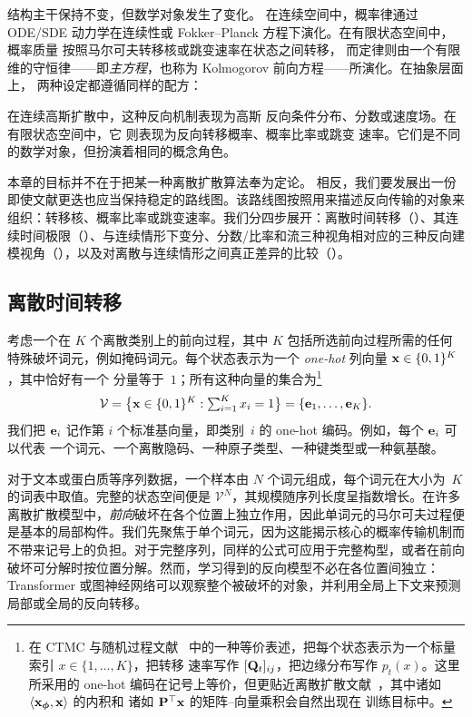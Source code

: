 结构主干保持不变，但数学对象发生了变化。
在连续空间中，概率律通过 ODE/SDE 动力学在连续性或
Fokker--Planck 方程下演化。在有限状态空间中，概率质量
按照马尔可夫转移核或跳变速率在状态之间转移，
而定律则由一个有限维的守恒律——即\emph{主方程}，也称为 Kolmogorov 前向方程——所演化。在抽象层面上，
两种设定都遵循同样的配方：


在连续高斯扩散中，这种反向机制表现为高斯
反向条件分布、分数或速度场。在有限状态空间中，它
则表现为反向转移概率、概率比率或跳变
速率。它们是不同的数学对象，但扮演着相同的概念角色。

本章的目标并不在于把某一种离散扩散算法奉为定论。
相反，我们要发展出一份即使文献更迭也应当保持稳定的路线图。该路线图按照用来描述反向传输的对象来组织：转移核、概率比率或跳变速率。我们分四步展开：离散时间转移（）、其连续时间极限（）、与连续情形下变分、分数/比率和流三种视角相对应的三种反向建模视角（），以及对离散与连续情形之间真正差异的比较（）。

\subsection{离散时间转移}
\label{subsec:epilogue-dtmc}

考虑一个在 $K$ 个离散类别上的前向过程，其中 $K$
包括所选前向过程所需的任何特殊破坏词元，例如掩码词元。每个状态表示为一个
\emph{one-hot} 列向量 ${\mathbf{x}}\in\{0,1\}^{K}$，其中恰好有一个
分量等于~$1$；所有这种向量的集合为\footnote{在 CTMC 与随机过程文献~\citep{norris1998markov,kelly1979reversibility} 中的一种等价表述，把每个状态表示为一个标量索引 $x\in\{1,\dots,K\}$，把转移
速率写作 $[{\mathbf{Q}}_t]_{ij}$，把边缘分布写作 $p_t(x)$。这里所采用的 one-hot 编码在记号上等价，但更贴近离散扩散文献~\citep{austin2021structured,sahoo2024simple,lou2024discrete}，其中诸如 $\langle{\mathbf{x}}_{{\bm{\phi}}},{\mathbf{x}}\rangle$ 的内积和
诸如 ${\mathbf{P}}^{\top}{\mathbf{x}}$ 的矩阵--向量乘积会自然出现在
训练目标中。}
\[
\mathcal{V}
= \bigl\{{\mathbf{x}}\in\{0,1\}^{K}:\textstyle\sum_{i=1}^{K}x_i=1\bigr\}
= \{{\mathbf{e}}_1,\ldots,{\mathbf{e}}_K\}.
\]
我们把 ${\mathbf{e}}_i$ 记作第 $i$ 个标准基向量，即类别~$i$ 的 one-hot
编码。例如，每个 ${\mathbf{e}}_i$ 可以代表
一个词元、一个离散隐码、一种原子类型、一种键类型或一种氨基酸。

对于文本或蛋白质等序列数据，一个样本由 $N$
个词元组成，每个词元在大小为~$K$ 的词表中取值。完整的状态空间便是 $\mathcal{V}^N$，其规模随序列长度呈指数增长。在许多离散扩散模型中，\emph{前向}破坏在各个位置上独立作用，因此单词元的马尔可夫过程便是基本的局部构件。我们先聚焦于单个词元，因为这能揭示核心的概率传输机制而不带来记号上的负担。对于完整序列，同样的公式可应用于完整构型，或者在前向破坏可分解时按位置分解。然而，学习得到的反向模型不必在各位置间独立：Transformer 或图神经网络可以观察整个被破坏的对象，并利用全局上下文来预测局部或全局的反向转移。

